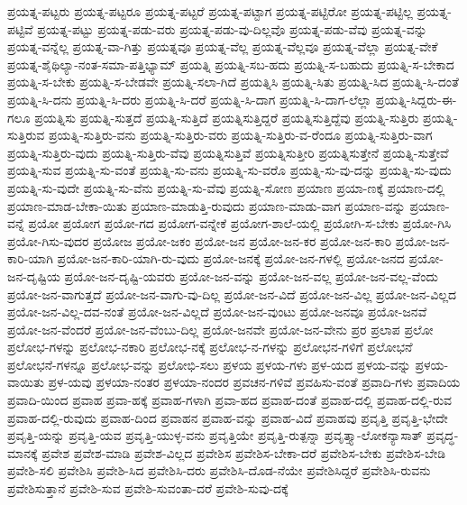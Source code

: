 {ಪ್ರಯತ್ನ-ಪಟ್ಟರು
ಪ್ರಯತ್ನ-ಪಟ್ಟರೂ
ಪ್ರಯತ್ನ-ಪಟ್ಟರೆ
ಪ್ರಯತ್ನ-ಪಟ್ಟಾಗ
ಪ್ರಯತ್ನ-ಪಟ್ಟಿರೋ
ಪ್ರಯತ್ನ-ಪಟ್ಟಿಲ್ಲ
ಪ್ರಯತ್ನ-ಪಟ್ಟಿವೆ
ಪ್ರಯತ್ನ-ಪಟ್ಟು
ಪ್ರಯತ್ನ-ಪಡು-ವರು
ಪ್ರಯತ್ನ-ಪಡು-ವು-ದಿಲ್ಲವೊ
ಪ್ರಯತ್ನ-ಪಡು-ವೆವು
ಪ್ರಯತ್ನ-ವನ್ನು
ಪ್ರಯತ್ನ-ವನ್ನೆಲ್ಲ
ಪ್ರಯತ್ನ-ವಾ-ಗಿತ್ತು
ಪ್ರಯತ್ನವೂ
ಪ್ರಯತ್ನ-ವೆಲ್ಲ
ಪ್ರಯತ್ನ-ವೆಲ್ಲವೂ
ಪ್ರಯತ್ನ-ವೆಲ್ಲಾ
ಪ್ರಯತ್ನ-ವೇಕೆ
ಪ್ರಯತ್ನ-ಶೈಥಿಲ್ಯಾ-ನಂತ-ಸಮಾ-ಪತ್ತಿಭ್ಯಾಮ್
ಪ್ರಯತ್ನಿ
ಪ್ರಯತ್ನಿ-ಸಬ-ಹದು
ಪ್ರಯತ್ನಿ-ಸ-ಬಹುದು
ಪ್ರಯತ್ನಿ-ಸ-ಬೇಕಾದ
ಪ್ರಯತ್ನಿ-ಸ-ಬೇಕು
ಪ್ರಯತ್ನಿ-ಸ-ಬೇಡವೇ
ಪ್ರಯತ್ನಿ-ಸಲಾ-ಗಿದೆ
ಪ್ರಯತ್ನಿಸಿ
ಪ್ರಯತ್ನಿ-ಸಿತು
ಪ್ರಯತ್ನಿ-ಸಿದ
ಪ್ರಯತ್ನಿ-ಸಿ-ದಂತೆ
ಪ್ರಯತ್ನಿ-ಸಿ-ದನು
ಪ್ರಯತ್ನಿ-ಸಿ-ದರು
ಪ್ರಯತ್ನಿ-ಸಿ-ದರೆ
ಪ್ರಯತ್ನಿ-ಸಿ-ದಾಗ
ಪ್ರಯತ್ನಿ-ಸಿ-ದಾಗ-ಲೆಲ್ಲಾ
ಪ್ರಯತ್ನಿ-ಸಿದ್ದರು-ಈ-ಗಲೂ
ಪ್ರಯತ್ನಿಸು
ಪ್ರಯತ್ನಿ-ಸುತ್ತದೆ
ಪ್ರಯತ್ನಿ-ಸುತ್ತಿದೆ
ಪ್ರಯತ್ನಿಸುತ್ತಿದ್ದರೆ
ಪ್ರಯತ್ನಿಸುತ್ತಿದ್ದೆವು
ಪ್ರಯತ್ನಿ-ಸುತ್ತಿರು
ಪ್ರಯತ್ನಿ-ಸುತ್ತಿರುವ
ಪ್ರಯತ್ನಿ-ಸುತ್ತಿರು-ವನು
ಪ್ರಯತ್ನಿ-ಸುತ್ತಿರು-ವರು
ಪ್ರಯತ್ನಿ-ಸುತ್ತಿರು-ವ-ರೆಂದೂ
ಪ್ರಯತ್ನಿ-ಸುತ್ತಿರು-ವಾಗ
ಪ್ರಯತ್ನಿ-ಸುತ್ತಿರು-ವುದು
ಪ್ರಯತ್ನಿ-ಸುತ್ತಿರು-ವೆವು
ಪ್ರಯತ್ನಿಸುತ್ತಿವೆ
ಪ್ರಯತ್ನಿಸುತ್ತೀರಿ
ಪ್ರಯತ್ನಿಸುತ್ತೇನೆ
ಪ್ರಯತ್ನಿ-ಸುತ್ತೇವೆ
ಪ್ರಯತ್ನಿ-ಸುವ
ಪ್ರಯತ್ನಿ-ಸು-ವಂತೆ
ಪ್ರಯತ್ನಿ-ಸು-ವನು
ಪ್ರಯತ್ನಿ-ಸು-ವರೊ
ಪ್ರಯತ್ನಿ-ಸು-ವು-ದನ್ನು
ಪ್ರಯತ್ನಿ-ಸು-ವುದು
ಪ್ರಯತ್ನಿ-ಸು-ವುದೇ
ಪ್ರಯತ್ನಿ-ಸು-ವೆನು
ಪ್ರಯತ್ನಿ-ಸು-ವೆವು
ಪ್ರಯತ್ನಿ-ಸೋಣ
ಪ್ರಯಾಣ
ಪ್ರಯಾ-ಣಕ್ಕೆ
ಪ್ರಯಾಣ-ದಲ್ಲಿ
ಪ್ರಯಾಣ-ಮಾಡ-ಬೇಕಾ-ಯಿತು
ಪ್ರಯಾಣ-ಮಾಡುತ್ತಿ-ರುವುದು
ಪ್ರಯಾಣ-ಮಾಡು-ವಾಗ
ಪ್ರಯಾಣ-ವನ್ನು
ಪ್ರಯಾಣ-ವನ್ನೆ
ಪ್ರಯೋ
ಪ್ರಯೋಗ
ಪ್ರಯೋ-ಗದ
ಪ್ರಯೋಗ-ವನ್ನೇಕೆ
ಪ್ರಯೋಗ-ಶಾಲೆ-ಯಲ್ಲಿ
ಪ್ರಯೋಗಿ-ಸ-ಬೇಕು
ಪ್ರಯೋ-ಗಿಸಿ
ಪ್ರಯೋ-ಗಿಸು-ವುದರ
ಪ್ರಯೋಜ
ಪ್ರಯೋ-ಜಕಂ
ಪ್ರಯೋ-ಜನ
ಪ್ರಯೋ-ಜನ-ಕರ
ಪ್ರಯೋ-ಜನ-ಕಾರಿ
ಪ್ರಯೋ-ಜನ-ಕಾರಿ-ಯಾಗಿ
ಪ್ರಯೋ-ಜನ-ಕಾರಿ-ಯಾಗಿ-ರು-ವುದು
ಪ್ರಯೋ-ಜನಕ್ಕೆ
ಪ್ರಯೋ-ಜನ-ಗಳಲ್ಲಿ
ಪ್ರಯೋ-ಜನದ
ಪ್ರಯೋ-ಜನ-ದೃಷ್ಟಿಯ
ಪ್ರಯೋ-ಜನ-ದೃಷ್ಟಿ-ಯವರು
ಪ್ರಯೋ-ಜನ-ವನ್ನು
ಪ್ರಯೋ-ಜನ-ವಲ್ಲ
ಪ್ರಯೋ-ಜನ-ವಲ್ಲ-ವೆಂದು
ಪ್ರಯೋ-ಜನ-ವಾಗುತ್ತದೆ
ಪ್ರಯೋ-ಜನ-ವಾಗು-ವು-ದಿಲ್ಲ
ಪ್ರಯೋ-ಜನ-ವಿದೆ
ಪ್ರಯೋ-ಜನ-ವಿಲ್ಲ
ಪ್ರಯೋ-ಜನ-ವಿಲ್ಲದ
ಪ್ರಯೋ-ಜನ-ವಿಲ್ಲ-ದವ-ನಂತೆ
ಪ್ರಯೋ-ಜನ-ವಿಲ್ಲದೆ
ಪ್ರಯೋ-ಜನ-ವುಂಟು
ಪ್ರಯೋ-ಜನವೂ
ಪ್ರಯೋ-ಜನವೆ
ಪ್ರಯೋ-ಜನ-ವೆಂದರೆ
ಪ್ರಯೋ-ಜನ-ವೆಂಬು-ದಿಲ್ಲ
ಪ್ರಯೋ-ಜನವೇ
ಪ್ರಯೋ-ಜನ-ವೇನು
ಪ್ರರ
ಪ್ರಲಾಪ
ಪ್ರಲೋ
ಪ್ರಲೋಭ-ಗಳನ್ನು
ಪ್ರಲೋಭ-ನಕಾರಿ
ಪ್ರಲೋಭ-ನಕ್ಕೆ
ಪ್ರಲೋಭ-ನ-ಗಳನ್ನು
ಪ್ರಲೋಭನ-ಗಳಿಗೆ
ಪ್ರಲೋಭನೆ
ಪ್ರಲೋಭನೆ-ಗಳನ್ನೂ
ಪ್ರಲೋಭ-ವನ್ನು
ಪ್ರಲೋಭಿ-ಸಲು
ಪ್ರಳಯ
ಪ್ರಳಯ-ಗಳು
ಪ್ರಳ-ಯದ
ಪ್ರಳಯ-ವನ್ನು
ಪ್ರಳಯ-ವಾಯಿತು
ಪ್ರಳ-ಯವು
ಪ್ರಳಯಾ-ನಂತರ
ಪ್ರಳಯಾ-ನಂದರ
ಪ್ರವಚನ-ಗಳಿವೆ
ಪ್ರವಹಿಸು-ವಂತೆ
ಪ್ರವಾದಿ-ಗಳು
ಪ್ರವಾದಿಯ
ಪ್ರವಾದಿ-ಯಿಂದ
ಪ್ರವಾಹ
ಪ್ರವಾ-ಹಕ್ಕೆ
ಪ್ರವಾಹ-ಗಳಾಗಿ
ಪ್ರವಾ-ಹದ
ಪ್ರವಾಹ-ದಂತೆ
ಪ್ರವಾಹ-ದಲ್ಲಿ
ಪ್ರವಾಹ-ದಲ್ಲಿ-ರುವ
ಪ್ರವಾಹ-ದಲ್ಲಿ-ರುವುದು
ಪ್ರವಾಹ-ದಿಂದ
ಪ್ರವಾಹನ
ಪ್ರವಾಹ-ವನ್ನು
ಪ್ರವಾಹ-ವಿದೆ
ಪ್ರವಾಹವು
ಪ್ರವೃತ್ತಿ
ಪ್ರವೃತ್ತಿ-ಭೇದೇ
ಪ್ರವೃತ್ತಿ-ಯನ್ನು
ಪ್ರವೃತ್ತಿ-ಯವ
ಪ್ರವೃತ್ತಿ-ಯುಳ್ಳ-ವನು
ಪ್ರವೃತ್ತಿಯೇ
ಪ್ರವೃತ್ತಿ-ರುತ್ಪನ್ನಾ
ಪ್ರವೃತ್ತ್ಯಾ-ಲೋಕನ್ಯಾಸಾತ್
ಪ್ರವೃದ್ಧ-ಮಾನಕ್ಕೆ
ಪ್ರವೇಶ
ಪ್ರವೇಶ-ಮಾಡಿ
ಪ್ರವೇಶ-ವಿಲ್ಲದ
ಪ್ರವೇಶಿಸ
ಪ್ರವೇಶಿಸ-ಬೇಕಾ-ದರೆ
ಪ್ರವೇಶಿಸ-ಬೇಕು
ಪ್ರವೇಶಿಸ-ಬೇಡಿ
ಪ್ರವೇಶಿ-ಸಲಿ
ಪ್ರವೇಶಿಸಿ
ಪ್ರವೇಶಿ-ಸಿದ
ಪ್ರವೇಶಿಸಿ-ದರು
ಪ್ರವೇಶಿಸಿ-ದೊಡ-ನೆಯೇ
ಪ್ರವೇಶಿಸಿದ್ದರೆ
ಪ್ರವೇಶಿಸಿ-ರುವನು
ಪ್ರವೇಶಿಸುತ್ತಾನೆ
ಪ್ರವೇಶಿ-ಸುವ
ಪ್ರವೇಶಿ-ಸುವಂತಾ-ದರೆ
ಪ್ರವೇಶಿ-ಸುವು-ದಕ್ಕೆ
}
